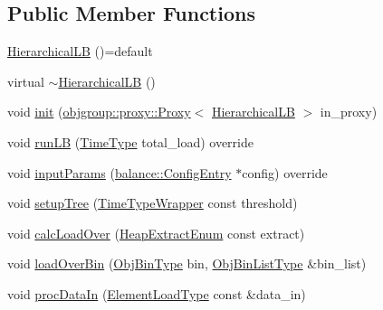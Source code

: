 \subsection*{Public Member Functions}
\begin{DoxyCompactItemize}
\item 
\hyperlink{structvt_1_1vrt_1_1collection_1_1lb_1_1_hierarchical_l_b_ac654b0d8eca15063f5138ec56ebb2bbb}{Hierarchical\+LB} ()=default
\item 
virtual \hyperlink{structvt_1_1vrt_1_1collection_1_1lb_1_1_hierarchical_l_b_aa2b6be5befe22ad9edcf796e9ac91568}{$\sim$\+Hierarchical\+LB} ()
\item 
void \hyperlink{structvt_1_1vrt_1_1collection_1_1lb_1_1_hierarchical_l_b_a3200eb80dca7ad15c7f881dc418f22f7}{init} (\hyperlink{structvt_1_1objgroup_1_1proxy_1_1_proxy}{objgroup\+::proxy\+::\+Proxy}$<$ \hyperlink{structvt_1_1vrt_1_1collection_1_1lb_1_1_hierarchical_l_b}{Hierarchical\+LB} $>$ in\+\_\+proxy)
\item 
void \hyperlink{structvt_1_1vrt_1_1collection_1_1lb_1_1_hierarchical_l_b_a8678acfa7b587e6003a4701def240595}{run\+LB} (\hyperlink{namespacevt_a876a9d0cd5a952859c72de8a46881442}{Time\+Type} total\+\_\+load) override
\item 
void \hyperlink{structvt_1_1vrt_1_1collection_1_1lb_1_1_hierarchical_l_b_a2ef293b1f626aa50e4ac4dd7ed12915c}{input\+Params} (\hyperlink{structvt_1_1vrt_1_1collection_1_1balance_1_1_config_entry}{balance\+::\+Config\+Entry} $\ast$config) override
\item 
void \hyperlink{structvt_1_1vrt_1_1collection_1_1lb_1_1_hierarchical_l_b_a585a35b50be78c7ef282466a75d7526c}{setup\+Tree} (\hyperlink{structvt_1_1_time_type_wrapper}{Time\+Type\+Wrapper} const threshold)
\item 
void \hyperlink{structvt_1_1vrt_1_1collection_1_1lb_1_1_hierarchical_l_b_a6fb4de858caf08759fe503b04f4cdded}{calc\+Load\+Over} (\hyperlink{namespacevt_1_1vrt_1_1collection_1_1lb_aeb0f47cf4b89bed7ea05462d0c2e5b5e}{Heap\+Extract\+Enum} const extract)
\item 
void \hyperlink{structvt_1_1vrt_1_1collection_1_1lb_1_1_hierarchical_l_b_a81e03ca1264d0b2cf9b0ee3eef7f792a}{load\+Over\+Bin} (\hyperlink{structvt_1_1vrt_1_1collection_1_1lb_1_1_load_sampler_base_l_b_acb55af31b27a3c248d351189abd78487}{Obj\+Bin\+Type} bin, \hyperlink{structvt_1_1vrt_1_1collection_1_1lb_1_1_load_sampler_base_l_b_a58de8f1e1204cf52b661b3906e2d9eeb}{Obj\+Bin\+List\+Type} \&bin\+\_\+list)
\item 
void \hyperlink{structvt_1_1vrt_1_1collection_1_1lb_1_1_hierarchical_l_b_afcd789adcc57348b7da92801119bd8f1}{proc\+Data\+In} (\hyperlink{structvt_1_1vrt_1_1collection_1_1lb_1_1_base_l_b_aa286d31a0820a8fc9218ccb858368fca}{Element\+Load\+Type} const \&data\+\_\+in)
\end{DoxyCompactItemize}
